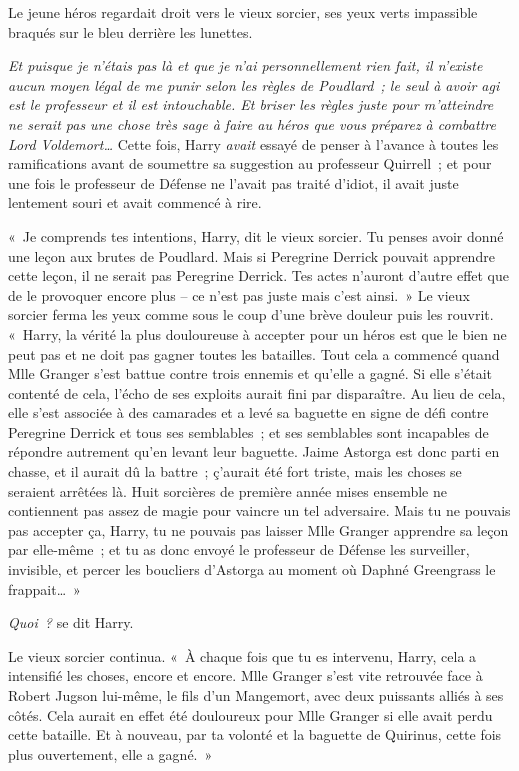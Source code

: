 Le jeune héros regardait droit vers le vieux sorcier, ses yeux verts impassible braqués sur le bleu derrière les lunettes.

\emph{Et puisque je n'étais pas là et que je n'ai personnellement rien fait, il n'existe aucun moyen légal de me punir selon les règles de Poudlard~; le seul à avoir agi est le professeur et il est intouchable.
Et briser les règles juste pour m'atteindre ne serait pas une chose très sage à faire au héros que vous préparez à combattre Lord Voldemort…} Cette fois, Harry \emph{avait} essayé de penser à l'avance à toutes les ramifications avant de soumettre sa suggestion au professeur Quirrell~; et pour une fois le professeur de Défense ne l'avait pas traité d'idiot, il avait juste lentement souri et avait commencé à rire.

«~Je comprends tes intentions, Harry, dit le vieux sorcier.
Tu penses avoir donné une leçon aux brutes de Poudlard.
Mais si Peregrine Derrick pouvait apprendre cette leçon, il ne serait pas Peregrine Derrick.
Tes actes n'auront d'autre effet que de le provoquer encore plus -- ce n'est pas juste mais c'est ainsi.~»
Le vieux sorcier ferma les yeux comme sous le coup d'une brève douleur puis les rouvrit.
«~Harry, la vérité la plus douloureuse à accepter pour un héros est que le bien ne peut pas et ne doit pas gagner toutes les batailles.
Tout cela a commencé quand Mlle Granger s'est battue contre trois ennemis et qu'elle a gagné.
Si elle s'était contenté de cela, l'écho de ses exploits aurait fini par disparaître.
Au lieu de cela, elle s'est associée à des camarades et a levé sa baguette en signe de défi contre Peregrine Derrick et tous ses semblables~; et ses semblables sont incapables de répondre autrement qu'en levant leur baguette.
Jaime Astorga est donc parti en chasse, et il aurait dû la battre~; ç'aurait été fort triste, mais les choses se seraient arrêtées là.
Huit sorcières de première année mises ensemble ne contiennent pas assez de magie pour vaincre un tel adversaire.
Mais tu ne pouvais pas accepter ça, Harry, tu ne pouvais pas laisser Mlle Granger apprendre sa leçon par elle-même~; et tu as donc envoyé le professeur de Défense les surveiller, invisible, et percer les boucliers d'Astorga au moment où Daphné Greengrass le frappait…~»

\emph{Quoi~?} se dit Harry.

Le vieux sorcier continua.
«~À chaque fois que tu es intervenu, Harry, cela a intensifié les choses, encore et encore.
Mlle Granger s'est vite retrouvée face à Robert Jugson lui-même, le fils d'un Mangemort, avec deux puissants alliés à ses côtés.
Cela aurait en effet été douloureux pour Mlle Granger si elle avait perdu cette bataille.
Et à nouveau, par ta volonté et la baguette de Quirinus, cette fois plus ouvertement, elle a gagné.~»


